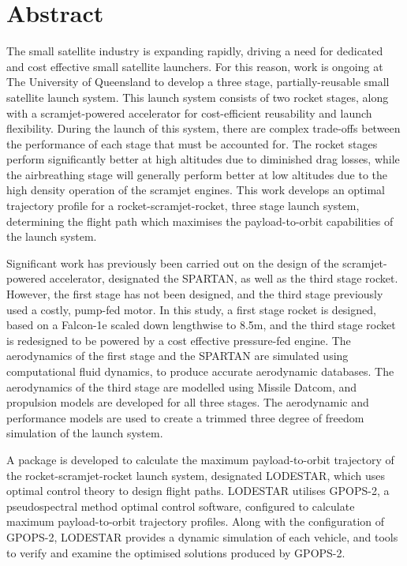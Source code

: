 \cleardoublepage

\section*{Abstract}

 The small satellite industry is expanding rapidly, driving a need for dedicated and cost effective small satellite launchers.  
 For this reason, work is ongoing at The University of Queensland to develop a three stage, partially-reusable small satellite launch system. This launch system consists of two rocket stages, along with a scramjet-powered accelerator for cost-efficient reusability and launch flexibility.
During the launch of this system, there are complex trade-offs between the performance of each stage that must be accounted for. The rocket stages perform significantly better at high altitudes due to diminished drag losses, while the airbreathing stage will generally perform better at low altitudes due to the high density operation of the scramjet engines. 
 This work develops an optimal trajectory profile for a rocket-scramjet-rocket, three stage launch system, determining the flight path which maximises the payload-to-orbit capabilities of the launch system. 
 
 Significant work has previously been carried out on the design of the scramjet-powered accelerator, designated the SPARTAN, as well as the third stage rocket. 
 However, the first stage has not been designed, and the third stage previously used a costly, pump-fed motor. 
 In this study, a first stage rocket is designed, based on a Falcon-1e scaled down lengthwise to 8.5m, and the third stage rocket is redesigned to be powered by a cost effective pressure-fed engine. 
 The aerodynamics of the first stage and the SPARTAN are simulated using computational fluid dynamics, to produce accurate aerodynamic databases. 
 The aerodynamics of the third stage are modelled using Missile Datcom, and propulsion models are developed for all three stages. The aerodynamic and performance models are used to create a trimmed three degree of freedom simulation of the launch system. 
 
 A package is developed to calculate the maximum payload-to-orbit trajectory of the rocket-scramjet-rocket launch system, designated LODESTAR, which uses optimal control theory to design flight paths. LODESTAR utilises GPOPS-2, a pseudospectral method optimal control software, configured to calculate maximum payload-to-orbit trajectory profiles. Along with the configuration of GPOPS-2, LODESTAR provides a dynamic simulation of each vehicle, and tools to verify and examine the optimised solutions produced by GPOPS-2. 
 
